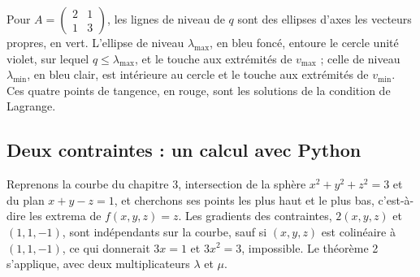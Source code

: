 \documentclass[a4paper,twoside]{report}
\begin{document}
\begin{center}
\end{center}

\noindent Pour $A = \begin{pmatrix} 2 & 1 \\ 1 & 3 \end{pmatrix}$, les lignes de niveau de $q$ sont des ellipses d'axes les vecteurs propres, en vert. L'ellipse de niveau $\lambda_{\max}$, en bleu foncé, entoure le cercle unité violet, sur lequel $q \leqslant \lambda_{\max}$, et le touche aux extrémités de $v_{\max}$ ; celle de niveau $\lambda_{\min}$, en bleu clair, est intérieure au cercle et le touche aux extrémités de $v_{\min}$. Ces quatre points de tangence, en rouge, sont les solutions de la condition de Lagrange.

\subsection{Deux contraintes : un calcul avec Python}

Reprenons la courbe du chapitre 3, intersection de la sphère $x^{2} + y^{2} + z^{2} = 3$ et du plan $x + y - z = 1$, et cherchons ses points les plus haut et le plus bas, c'est-à-dire les extrema de $f(x, y, z) = z$. Les gradients des contraintes, $2(x, y, z)$ et $(1, 1, -1)$, sont indépendants sur la courbe, sauf si $(x, y, z)$ est colinéaire à $(1, 1, -1)$, ce qui donnerait $3x = 1$ et $3x^{2} = 3$, impossible. Le théorème 2 s'applique, avec deux multiplicateurs $\lambda$ et $\mu$.
\end{document}
